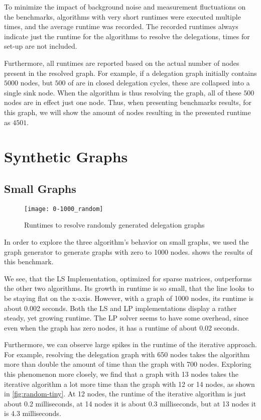 To minimize the impact of background noise and measurement fluctuations on the benchmarks, algorithms with very short runtimes were executed multiple times, and the average runtime was recorded. The recorded runtimes always indicate just the runtime for the algorithms to resolve the delegations, times for set-up are not included. 

Furthermore, all runtimes are reported based on the actual number of nodes present in the resolved graph. For example, if a delegation graph initially contains $5000$ nodes, but $500$ of are in closed delegation cycles, these are collapsed into a single sink node. 
When the algorithm is thus resolving the graph, all of these $500$ nodes are in effect just one node. Thus, when presenting benchmarks results, for this graph, we will show the amount of nodes resulting in the presented runtime as $4501$. 

\section{Synthetic Graphs}
\label{sec:synthetic_graphs}

\subsection{Small Graphs}
\label{subsec:small_graphs}

\begin{figure}[t]
    \centering
    \texttt{[image: 0-1000\_random]}
    \caption{Runtimes to resolve randomly generated delegation graphs}
    \label{fig:random-small}
\end{figure}

In order to explore the three algorithm's behavior on small graphs, we used the graph generator to generate graphs with zero to 1000 nodes.  shows the results of this benchmark.

We see, that the LS Implementation, optimized for sparse matrices, outperforms the other two algorithms. Its growth in runtime is so small, that the line looks to be staying flat on the x-axis. However, with a graph of 1000 nodes, its runtime is about 0.002 seconds. Both the LS and LP implementations display a rather steady, yet growing runtime. The LP solver seems to have some overhead, since even when the graph has zero nodes, it has a runtime of about 0.02 seconds.

Furthermore, we can observe large spikes in the runtime of the iterative approach. For example, resolving the delegation graph with 650 nodes takes the algorithm more than double the amount of time than the graph with 700 nodes. Exploring this phenomenon more closely, we find that a graph with 13 nodes takes the iterative algorithm a lot more time than the graph with 12 or 14 nodes, as shown in \cref{fig:random-tiny}. At 12 nodes, the runtime of the iterative algorithm is just about 0.2 milliseconds, at 14 nodes it is about 0.3 milliseconds, but at 13 nodes it is 4.3 milliseconds. 


